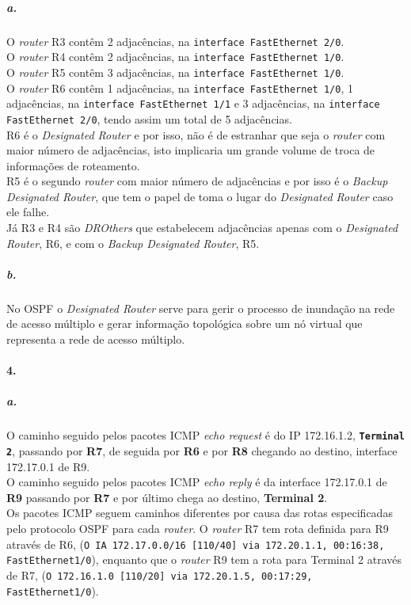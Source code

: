 \subparagraph{a.}
O \emph{router} \textsf{R3} contêm 2 adjacências, na \texttt{interface FastEthernet 2/0}.\\
O \emph{router} \textsf{R4} contêm 2 adjacências, na \texttt{interface FastEthernet 1/0}.\\
O \emph{router} \textsf{R5} contêm 3 adjacências, na \texttt{interface FastEthernet 1/0}.\\
O \emph{router} \textsf{R6} contêm 1 adjacências, na \texttt{interface FastEthernet 1/0}, 1 adjacências, na \texttt{interface FastEthernet 1/1} e 3 adjacências, na \texttt{interface FastEthernet 2/0}, tendo assim um total de 5 adjacências.\\
\textsf{R6} é o \emph{Designated Router} e por isso, não é de estranhar que seja o \emph{router} com maior número de adjacências, isto implicaria um grande volume de troca de informações de roteamento.\\
\textsf{R5} é o segundo \emph{router} com maior número de adjacências e por isso é o \emph{Backup Designated Router}, que tem o papel de toma o lugar do \emph{Designated Router} caso ele falhe.\\
Já \textsf{R3} e \textsf{R4} são \emph{DROthers} que estabelecem adjacências apenas com o \emph{Designated Router}, \textsf{R6}, e com o \emph{Backup Designated Router}, \textsf{R5}.

\subparagraph{b.}
No OSPF o \emph{Designated Router} serve para gerir o processo de inundação na rede de acesso múltiplo e gerar informação topológica sobre um nó virtual que representa a rede de acesso múltiplo.

\paragraph{4.}
\subparagraph{a.}
O caminho seguido pelos pacotes ICMP \emph{echo request} é do IP 172.16.1.2, \textbf{\texttt{Terminal 2}}, passando por \textbf{\textsf{R7}}, de seguida por \textbf{\textsf{R6}} e por \textbf{\textsf{R8}} chegando ao destino, interface 172.17.0.1 de \textsf{R9}.\\
O caminho seguido pelos pacotes ICMP \emph{echo reply} é da interface 172.17.0.1 de \textbf{\textsf{R9}} passando por \textbf{\textsf{R7}} e por último chega ao destino, \textbf{\textsf{Terminal 2}}.\\
Os pacotes ICMP seguem caminhos diferentes por causa das rotas especificadas pelo protocolo OSPF para cada \emph{router}. O \emph{router} \textsf{R7} tem rota definida para \textsf{R9} através de \textsf{R6}, (\texttt{O IA 172.17.0.0/16 [110/40] via 172.20.1.1, 00:16:38, FastEthernet1/0}), enquanto que o \emph{router} \textsf{R9} tem a rota para \textsf{Terminal 2} através de \textsf{R7}, (\texttt{O 172.16.1.0 [110/20] via 172.20.1.5, 00:17:29, FastEthernet1/0}).

